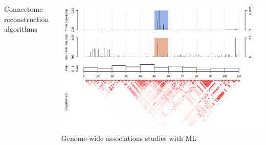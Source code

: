 \documentclass{beamer}
\begin{document}
\begin{frame}
\begin{columns}
\begin{column}{0.25\textwidth}
            \scriptsize Connectome reconstruction algorithms
        \end{column}
        \begin{column}{0.25\textwidth}
            \centering
            \includegraphics[width=\textwidth]{figures/gwas.png}\\
            \scriptsize Genome-wide associations studies with ML
        \end{column}
    \end{columns}
\end{frame}
\end{document}
